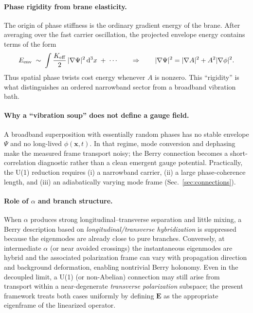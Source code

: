 \documentclass[11pt,a4paper]{article}
\providecommand{\dd}{\mathrm{d}}
\newcommand{\x}{\mathbf{x}}                 %
\begin{document}
\paragraph{Phase rigidity from brane elasticity.}
The origin of phase stiffness is the ordinary gradient energy of the brane.
After averaging over the fast carrier oscillation, the projected envelope energy contains terms of the form
\[
E_{\rm env}\;\sim\;\int \frac{K_{\rm eff}}{2}\,|\nabla\Psi|^2\,\dd^3x \;+\;\cdots
\qquad\Rightarrow\qquad
|\nabla\Psi|^2 = |\nabla A|^2 + A^2|\nabla\phi|^2.
\]
Thus spatial phase twists cost energy whenever $A$ is nonzero. This ``rigidity'' is what distinguishes an ordered
narrowband sector from a broadband vibration bath.

\paragraph{Why a ``vibration soup'' does not define a gauge field.}
A broadband superposition with essentially random phases has no stable envelope $\Psi$ and no long-lived $\phi(\x,t)$.
In that regime, mode conversion and dephasing make the measured frame transport noisy; the Berry connection becomes a
short-correlation diagnostic rather than a clean emergent gauge potential.
Practically, the U(1) reduction requires (i) a narrowband carrier, (ii) a large phase-coherence length, and
(iii) an adiabatically varying mode frame (Sec.~\ref{sec:connections}).

\paragraph{Role of $\alpha$ and branch structure.}
When $\alpha$ produces strong longitudinal--transverse separation and little mixing, a Berry description based on
\emph{longitudinal/transverse hybridization} is suppressed because the eigenmodes are already close to pure branches.
Conversely, at intermediate $\alpha$ (or near avoided crossings) the instantaneous eigenmodes are hybrid and the
associated polarization frame can vary with propagation direction and background deformation, enabling nontrivial
Berry holonomy. Even in the decoupled limit, a U(1) (or non-Abelian) connection may still arise from transport within
a near-degenerate \emph{transverse polarization} subspace; the present framework treats both cases uniformly by
defining $\mathbf{E}$ as the appropriate eigenframe of the linearized operator.
\end{document}
